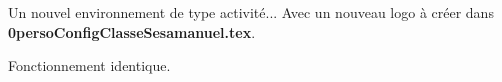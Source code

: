 \begin{nouveau}[titre][\newLogo]
    Un nouvel environnement de type activité... Avec un nouveau logo à créer dans \textbf{0persoConfigClasseSesamanuel.tex}.

    Fonctionnement identique.
\end{nouveau}
